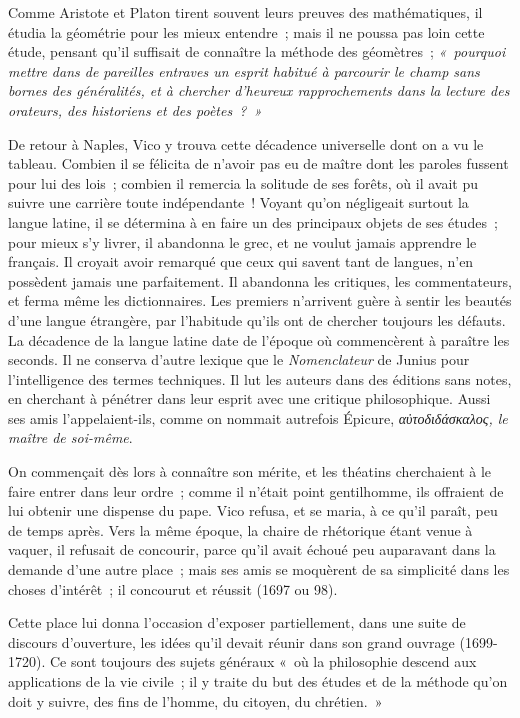 \documentclass[french,twoside]{book} %
\begin{document}
 Comme Aristote et Platon tirent souvent leurs preuves des mathématiques, il étudia la géométrie pour les mieux entendre ; mais il ne poussa pas loin cette étude, pensant qu’il suffisait de connaître la méthode des géomètres ; \emph{« pourquoi mettre dans de pareilles entraves un esprit habitué à parcourir le champ sans bornes des généralités, et à chercher d’heureux rapprochements dans la lecture des orateurs, des historiens et des poètes ? »}\par
De retour à Naples, Vico y trouva cette décadence universelle dont on a vu le tableau. Combien il se félicita de n’avoir pas eu de maître dont les paroles fussent pour lui des lois ; combien il remercia la solitude de ses forêts, où il avait pu suivre une carrière toute indépendante ! Voyant qu’on négligeait surtout la langue latine, il se détermina à en faire un des principaux objets de ses études ; pour mieux s’y livrer, il abandonna le grec, et ne voulut jamais apprendre le français. Il croyait avoir remarqué que ceux qui savent tant de langues, n’en possèdent jamais une parfaitement. Il abandonna les critiques, les commentateurs, et ferma même les dictionnaires. Les premiers n’arrivent guère à sentir les beautés d’une langue étrangère, par l’habitude qu’ils ont de chercher toujours les défauts. La décadence de la langue latine date de l’époque où commencèrent à paraître les seconds. Il ne conserva d’autre lexique que le {\itshape Nomenclateur} de Junius pour l’intelligence des termes techniques. Il lut les auteurs dans des éditions sans notes, en cherchant à pénétrer dans leur esprit avec une critique philosophique. Aussi ses amis l’appelaient-ils, comme on nommait autrefois Épicure, \emph{αὐτοδιδάσκαλος, {\itshape le maître de soi-même}}.\par
On commençait dès lors à connaître son mérite, et les théatins cherchaient à le faire entrer dans leur ordre ; comme il n’était point gentilhomme, ils offraient de lui obtenir une dispense du pape. Vico refusa, et se maria, à ce qu’il paraît, peu de temps après. Vers la même époque, la chaire de rhétorique étant venue à vaquer, il refusait de concourir, parce qu’il avait échoué peu auparavant dans la demande d’une autre place ; mais ses amis se moquèrent de sa simplicité dans les choses d’intérêt ; il concourut et réussit (1697 ou 98).\par
 Cette place lui donna l’occasion d’exposer partiellement, dans une suite de discours d’ouverture, les idées qu’il devait réunir dans son grand ouvrage (1699-1720). Ce sont toujours des sujets généraux « où la philosophie descend aux applications de la vie civile ; il y traite du but des études et de la méthode qu’on doit y suivre, des fins de l’homme, du citoyen, du chrétien. »\par
\end{document}
